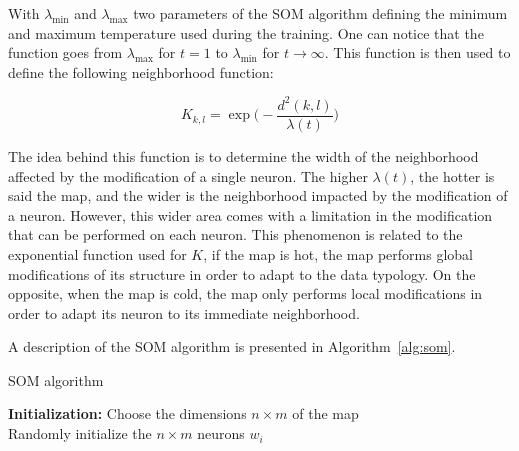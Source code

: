     With $\lambda_{\min}$ and $\lambda_{\max}$ two parameters of the SOM algorithm defining the minimum and maximum temperature used during the training. One can notice that the function goes from $\lambda_{\max}$ for $t=1$ to $\lambda_{\min}$ for $t\to \infty$. This function is then used to define the following neighborhood function:
    
    \begin{equation}
        K_{k,l} = \exp\Big(-\frac{d^2(k,l)}{\lambda(t)}\Big)
        \label{eq:som_neigh}
    \end{equation}

    The idea behind this function is to determine the width of the neighborhood affected by the modification of a single neuron. The higher $\lambda(t)$, the hotter is said the map, and the wider is the neighborhood impacted by the modification of a neuron. However, this wider area comes with a limitation in the modification that can be performed on each neuron. This phenomenon is related to the exponential function used for $K$, if the map is hot, the map performs global modifications of its structure in order to adapt to the data typology. On the opposite, when the map is cold, the map only performs local modifications in order to adapt its neuron to its immediate neighborhood.

    A description of the SOM algorithm is presented in Algorithm~\ref{alg:som}.

    \begin{algorithm}
        \caption{SOM algorithm}
\label{alg:som}
        \textbf{Initialization:} Choose the dimensions $n \times m$ of the map\\
        Randomly initialize the $n \times m$ neurons $w_i$\\
    \end{algorithm}

